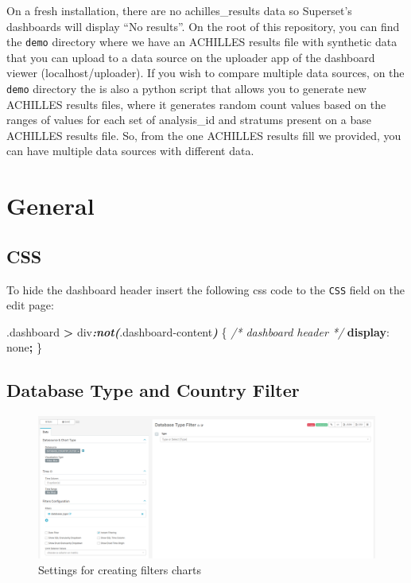 \documentclass[
]{book}
\newenvironment{Shaded}{\begin{snugshade}}{\end{snugshade}}
\newcommand{\CommentTok}[1]{\textcolor[rgb]{0.56,0.35,0.01}{\textit{#1}}}
\newcommand{\DecValTok}[1]{\textcolor[rgb]{0.00,0.00,0.81}{#1}}
\newcommand{\FunctionTok}[1]{\textcolor[rgb]{0.00,0.00,0.00}{#1}}
\newcommand{\InformationTok}[1]{\textcolor[rgb]{0.56,0.35,0.01}{\textbf{\textit{#1}}}}
\newcommand{\KeywordTok}[1]{\textcolor[rgb]{0.13,0.29,0.53}{\textbf{#1}}}
\newcommand{\NormalTok}[1]{#1}
\newcommand{\OperatorTok}[1]{\textcolor[rgb]{0.81,0.36,0.00}{\textbf{#1}}}
\begin{document}
On a fresh installation, there are no achilles\_results data so Superset's dashboards will display ``No results''. On the root of this repository, you can find the \texttt{demo} directory where we have an ACHILLES results file with synthetic data that you can upload to a data source on the uploader app of the dashboard viewer (localhost/uploader). If you wish to compare multiple data sources, on the \texttt{demo} directory the is also a python script that allows you to generate new ACHILLES results files, where it generates random count values based on the ranges of values for each set of analysis\_id and stratums present on a base ACHILLES results file. So, from the one ACHILLES results fill we provided, you can have multiple data sources with different data.

\hypertarget{general}{%
\chapter{General}\label{general}}

\hypertarget{css}{%
\section{CSS}\label{css}}

To hide the dashboard header insert the following css code to the \texttt{CSS} field on the edit page:

\begin{Shaded}
\begin{Highlighting}[]
\FunctionTok{.dashboard} \OperatorTok{\textgreater{}}\NormalTok{ div}\InformationTok{:not(}\FunctionTok{.dashboard{-}content}\InformationTok{)}\NormalTok{ \{  }\CommentTok{/* dashboard header */}
  \KeywordTok{display}\NormalTok{: }\DecValTok{none}\OperatorTok{;}
\NormalTok{\}}
\end{Highlighting}
\end{Shaded}

\hypertarget{database-type-and-country-filter}{%
\section{Database Type and Country Filter}\label{database-type-and-country-filter}}

\begin{figure}
\includegraphics[width=1\linewidth]{images/03-general/01-filters} \caption{Settings for creating filters charts}\label{fig:filters}
\end{figure}
\end{document}
